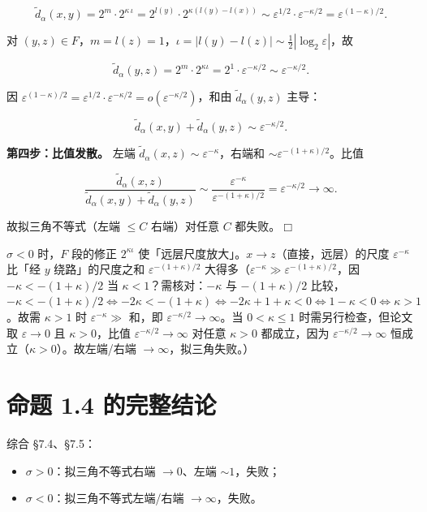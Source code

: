 \documentclass[a4paper,11pt,openany]{ctexbook}
\numberwithin{equation}{chapter}
\numberwithin{figure}{chapter}
\numberwithin{table}{chapter}
\begin{document}
$$\widetilde d_\alpha(x,y)=2^{m}\cdot2^{\kappa\,\iota}=2^{l(y)}\cdot2^{\kappa(l(y)-l(x))}\sim\varepsilon^{1/2}\cdot\varepsilon^{-\kappa/2}=\varepsilon^{(1-\kappa)/2}.$$

对 $(y,z)\in F$，$m=l(z)=1$，$\iota=|l(y)-l(z)|\sim\frac12|\log_2\varepsilon|$，故

$$\widetilde d_\alpha(y,z)=2^{m}\cdot2^{\kappa\iota}=2^1\cdot\varepsilon^{-\kappa/2}\sim\varepsilon^{-\kappa/2}.$$

因 $\varepsilon^{(1-\kappa)/2}=\varepsilon^{1/2}\cdot\varepsilon^{-\kappa/2}=o(\varepsilon^{-\kappa/2})$，和由 $\widetilde d_\alpha(y,z)$ 主导：

$$\widetilde d_\alpha(x,y)+\widetilde d_\alpha(y,z)\sim\varepsilon^{-\kappa/2}.$$

\textbf{第四步：比值发散。} 左端 $\widetilde d_\alpha(x,z)\sim\varepsilon^{-\kappa}$，右端和 $\sim\varepsilon^{-(1+\kappa)/2}$。比值

$$\frac{\widetilde d_\alpha(x,z)}{\widetilde d_\alpha(x,y)+\widetilde d_\alpha(y,z)}\sim\frac{\varepsilon^{-\kappa}}{\varepsilon^{-(1+\kappa)/2}}=\varepsilon^{-\kappa/2}\to\infty.$$

故拟三角不等式（左端 $\le C$ 右端）对任意 $C$ 都失败。$\Box$

\begin{intuitionbox}
$\sigma<0$ 时，$F$ 段的修正 $2^{\kappa\iota}$ 使「远层尺度放大」。$x\to z$（直接，远层）的尺度 $\varepsilon^{-\kappa}$ 比「经 $y$ 绕路」的尺度之和 $\varepsilon^{-(1+\kappa)/2}$ 大得多（$\varepsilon^{-\kappa}\gg\varepsilon^{-(1+\kappa)/2}$，因 $-\kappa<-(1+\kappa)/2$ 当 $\kappa<1$？需核对：$-\kappa$ 与 $-(1+\kappa)/2$ 比较，$-\kappa<-(1+\kappa)/2\iff-2\kappa<-(1+\kappa)\iff-2\kappa+1+\kappa<0\iff1-\kappa<0\iff\kappa>1$。故需 $\kappa>1$ 时 $\varepsilon^{-\kappa}\gg$ 和，即 $\varepsilon^{-\kappa/2}\to\infty$。当 $0<\kappa\le1$ 时需另行检查，但论文取 $\varepsilon\to0$ 且 $\kappa>0$，比值 $\varepsilon^{-\kappa/2}\to\infty$ 对任意 $\kappa>0$ 都成立，因为 $\varepsilon^{-\kappa/2}\to\infty$ 恒成立（$\kappa>0$）。故左端/右端 $\to\infty$，拟三角失败。）
\end{intuitionbox}

\section{命题 1.4 的完整结论}

综合 §7.4、§7.5：

\begin{itemize}
\item $\sigma>0$：拟三角不等式右端 $\to0$、左端 $\sim1$，失败；
\item $\sigma<0$：拟三角不等式左端/右端 $\to\infty$，失败。
\end{itemize}
\end{document}
